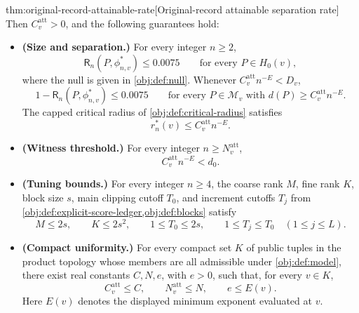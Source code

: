 \documentclass[11pt]{article}
\begin{document}
\begin{theoremv}{thm:original-record-attainable-rate}[Original-record attainable separation rate]
Then \(C^{\mathrm{att}}_v>0\), and the following guarantees hold:
\begin{itemize}
\item \textbf{(Size and separation.)}
For every integer \(n\ge2\),
\[
\mathsf R_n(P,\phi^*_{n,v})\le0.0075
\qquad\text{for every }P\in H_0(v),
\]
where the null is given in \cref{obj:def:null}. Whenever
\(C^{\mathrm{att}}_v n^{-E}<D_v\),
\[
1-\mathsf R_n(P,\phi^*_{n,v})\le0.0075
\qquad
\text{for every }P\in\mathcal M_v
\text{ with }d(P)\ge C^{\mathrm{att}}_v n^{-E}.
\]
The capped critical radius of \cref{obj:def:critical-radius} satisfies
\[
r_n^*(v)\le C^{\mathrm{att}}_v n^{-E}.
\]

\item \textbf{(Witness threshold.)}
For every integer \(n\ge N^{\mathrm{att}}_v\),
\[
C^{\mathrm{att}}_v n^{-E}<d_0.
\]

\item \textbf{(Tuning bounds.)}
For every integer \(n\ge4\), the coarse rank \(M\), fine rank \(K\), block size \(s\), main clipping cutoff \(T_0\), and increment cutoffs \(T_j\) from \cref{obj:def:explicit-score-ledger,obj:def:blocks} satisfy
\[
M\le2s,\qquad K\le2s^2,\qquad
1\le T_0\le2s,\qquad
1\le T_j\le T_0\quad(1\le j\le L).
\]

\item \textbf{(Compact uniformity.)}
For every compact set \(K\) of public tuples in the product topology whose members are all admissible under \cref{obj:def:model}, there exist real constants \(C,N,e\), with \(e>0\), such that, for every \(v\in K\),
\[
C^{\mathrm{att}}_v\le C,\qquad
N^{\mathrm{att}}_v\le N,\qquad e\le E(v).
\]
Here \(E(v)\) denotes the displayed minimum exponent evaluated at \(v\).
\end{itemize}


\end{theoremv}
\end{document}
